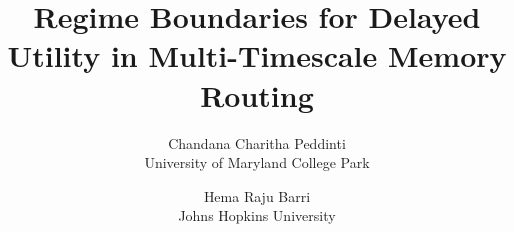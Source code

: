 \documentclass[11pt]{article}
\title{Regime Boundaries for Delayed Utility in Multi-Timescale Memory Routing}
\author{
Chandana Charitha Peddinti\\
University of Maryland College Park
\and
Hema Raju Barri\\
Johns Hopkins University
}
\date{}
\begin{document}
\maketitle

\begin{abstract}

\end{abstract}











\appendix




\end{document}
